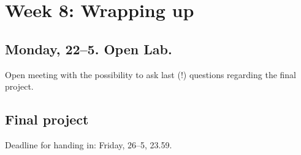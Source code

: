\section*{Week 8: Wrapping up}

\subsection*{Monday, 22--5. Open Lab.}
Open meeting with the possibility to ask last (!) questions regarding the final project.

\subsection*{Final project}
Deadline for handing in: Friday, 26--5, 23.59.

